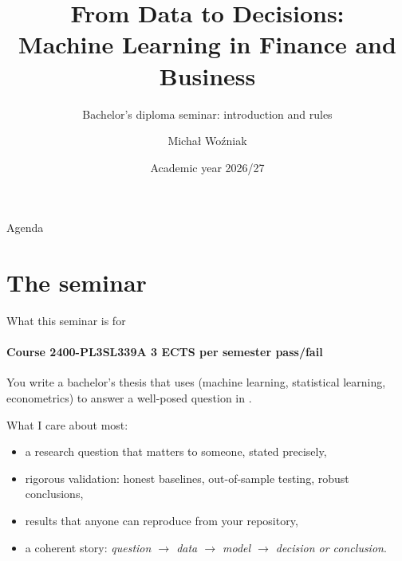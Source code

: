 \documentclass[aspectratio=169,11pt,t]{beamer}
\title[Diploma seminar kick-off]{From Data to Decisions:\\ Machine Learning in Finance and Business}
\subtitle{Bachelor's diploma seminar: introduction and rules}
\author{Michał Woźniak}
\institute{Faculty of Economic Sciences, University of Warsaw}
\date{Academic year 2026/27}
\begin{document}
\begin{frame}
  \titlepage
\end{frame}

\begin{frame}{Agenda}
  \tableofcontents
\end{frame}

\section{The seminar}

\begin{frame}{What this seminar is for}
  \framesubtitle{Course 2400-PL3SL339A \textbullet{} 3 ECTS per semester \textbullet{} pass/fail}
  You write a bachelor's thesis that uses  (machine learning,
  statistical learning, econometrics) to answer a well-posed question in .

  \bigskip
  What I care about most:
  \begin{itemize}
    \item a research question that matters to someone, stated precisely,
    \item rigorous validation: honest baselines, out-of-sample testing, robust conclusions,
    \item results that anyone can reproduce from your repository,
    \item a coherent story: \emph{question $\rightarrow$ data $\rightarrow$ model $\rightarrow$ decision or conclusion}.
  \end{itemize}

  \bigskip
\end{frame}
\end{document}
